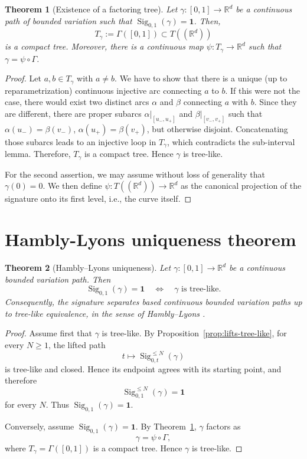 \documentclass[10pt,a4paper]{amsart}
\newtheorem{theorem}{Theorem}[section]
\newcommand{\R}{\mathbb{R}}
\newcommand{\Sig}{\operatorname{Sig}}
\newcommand{\id}{\mathbf{1}}
\begin{document}
\begin{theorem}[Existence of a factoring tree]\label{thm:quotient-tree}
Let $ \gamma:[0,1]\to\R^d $ be a continuous path of bounded variation such that $ \Sig_{0,1}(\gamma)=\id $. Then, 
$$ T_\gamma := \Gamma([0,1]) \subset T((\R^d))$$
is a compact tree. Moreover, there is a continuous map $  \psi:T_\gamma\to\R^d$ such that 
  $\gamma=\psi\circ \Gamma$. 
\end{theorem}
\begin{proof}
Let $a,b \in T_\gamma$ with $a \neq b$. We have to show that there is a unique (up to reparametrization) continuous injective arc connecting $a$ to $b$. If this were not the case, there would exist two distinct arcs $\alpha$ and $\beta$ connecting $a$ with $b$. Since they are different, there are proper subarcs $\alpha|_{[u_-,u_+]}$ and $\beta|_{[v_-,v_+]}$ such that $\alpha(u_-)=\beta(v_-)$, $\alpha(u_+)=\beta(v_+)$, but otherwise disjoint. Concatenating those subarcs leads to an injective loop in $T_\gamma$, which contradicts the sub-interval lemma. Therefore, $T_\gamma$ is a compact tree. Hence $\gamma$ is tree-like. 

 For the second assertion, we may assume without loss of generality that $\gamma(0) = 0$. We then define $\psi:T((\R^d))\to\R^d$ as the canonical projection of the signature onto its first level, i.e.,  the curve itself. 
\end{proof}

\section{Hambly-Lyons uniqueness theorem}


\begin{theorem}[Hambly--Lyons uniqueness]\label{thm:main}
Let $ \gamma:[0,1]\to\R^d $ be a continuous bounded variation path. Then
\[
  \Sig_{0,1}(\gamma)=\id
  \quad\Longleftrightarrow\quad
  \gamma \text{ is tree-like}.
\]
Consequently, the signature separates based continuous bounded variation paths up to tree-like equivalence, in the sense of Hambly--Lyons \cite{HL2010}.
\end{theorem}

\begin{proof}
Assume first that $\gamma$ is tree-like. By Proposition~\ref{prop:lifts-tree-like}, for every $N\geq1$,  the lifted path
\[
  t\longmapsto \Sig^{\leq N}_{0,t}(\gamma)
\]
is tree-like and closed. Hence its endpoint agrees with its starting point, and therefore
\[
  \Sig^{\leq N}_{0,1}(\gamma)=\id
\]
for every $N$. Thus $\Sig_{0,1}(\gamma)=\id$.

Conversely, assume $\Sig_{0,1}(\gamma)=\id$. By Theorem~\ref{thm:quotient-tree}, $\gamma$ factors as
\[
  \gamma=\psi \circ \Gamma, 
\]
where $T_\gamma =  \Gamma([0,1])$ is a compact tree. 
Hence $\gamma$ is tree-like.
\end{proof}
\end{document}
